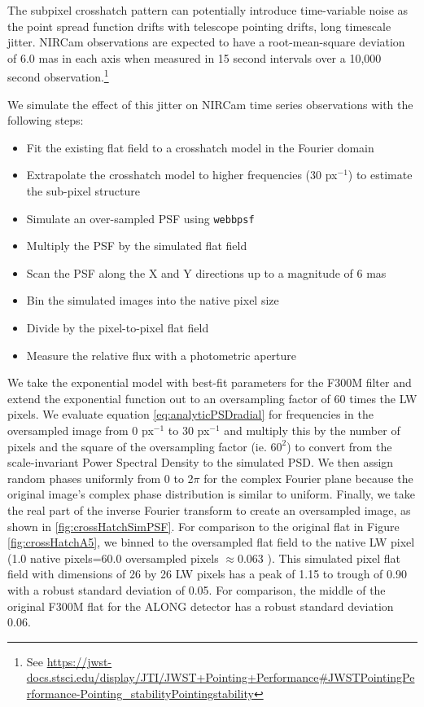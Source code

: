 \documentclass{aastex62}
\begin{document}
The subpixel crosshatch pattern can potentially introduce time-variable noise as the point spread function drifts with telescope pointing drifts, long timescale jitter.
NIRCam observations are expected to have a root-mean-square deviation of 6.0 mas in each axis when measured in 15 second intervals over a 10,000 second observation.\footnote{See \url{https://jwst-docs.stsci.edu/display/JTI/JWST+Pointing+Performance\#JWSTPointingPerformance-Pointing\_stabilityPointingstability}}

We simulate the effect of this jitter on NIRCam time series observations with the following steps:
\begin{itemize}
	\item Fit the existing flat field to a crosshatch model in the Fourier domain
	\item Extrapolate the crosshatch model to higher frequencies (30 px$^{-1}$) to estimate the sub-pixel structure
	\item Simulate an over-sampled PSF using \texttt{webbpsf} \citep{perrin2014webbpsf}
	\item Multiply the PSF by the simulated flat field
	\item Scan the PSF along the X and Y directions up to a magnitude of 6 mas
	\item Bin the simulated images into the native pixel size
	\item Divide by the pixel-to-pixel flat field
	\item Measure the relative flux with a photometric aperture
\end{itemize}



We take the exponential model with best-fit parameters for the F300M filter and extend the exponential function out to an oversampling factor of 60 times the LW pixels.
We evaluate equation \ref{eq:analyticPSDradial} for frequencies in the oversampled image from 0 px$^{-1}$ to 30 px$^{-1}$ and multiply this by the number of pixels and the square of the oversampling factor (ie. $60^2$) to convert from the scale-invariant Power Spectral Density to the simulated PSD.
We then assign random phases uniformly from 0 to 2$\pi$ for the complex Fourier plane because the original image's complex phase distribution is similar to uniform.
Finally, we take the real part of the inverse Fourier transform to create an oversampled image, as shown in \ref{fig:crossHatchSimPSF}.
For comparison to the original flat in Figure \ref{fig:crossHatchA5}, we binned to the oversampled flat field to the native LW pixel (1.0 native pixels=60.0 oversampled pixels $\approx$0.063 \arcsec).
This simulated pixel flat field with dimensions of 26 by 26 LW pixels has a peak of 1.15 to trough of 0.90 with a robust standard deviation of 0.05.
For comparison, the middle of the original F300M flat for the ALONG detector has a robust standard deviation 0.06.
\end{document}
